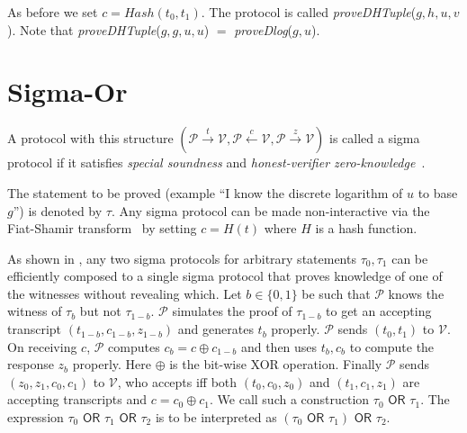 \documentclass[runningheads]{llncs}
\begin{document}
As before we set $c = Hash(t_0, t_1)$. The protocol is called \emph{proveDHTuple}($g, h, u, v$). Note that \emph{proveDHTuple}($g, g, u, u$) $=$ \emph{proveDlog}($g, u$).

\section{Sigma-Or}
\label{sigmaor}
A protocol with this structure $(\mathcal{P} \stackrel{t}{\rightarrow}\mathcal{V}, \mathcal{P} \stackrel{c}{\leftarrow}\mathcal{V}, \mathcal{P} \stackrel{z}{\rightarrow}\mathcal{V})$ is called a sigma protocol if it satisfies {\em special soundness} and {\em honest-verifier zero-knowledge}~\cite{Dam10}.

The statement to be proved (example ``I know the discrete logarithm of $u$ to base $g$'') is denoted by $\tau$.
Any sigma protocol can be made non-interactive via the Fiat-Shamir transform~\cite{fiatshamir} by setting $c= H(t)$ where $H$ is a hash function.

As shown in \cite{CDS94}, any two sigma protocols for arbitrary statements $\tau_0, \tau_1$ can be efficiently composed to a single sigma protocol that proves knowledge of one of the witnesses without revealing which. Let $b \in \{0, 1\}$ be such that $\mathcal{P}$ knows the witness of $\tau_{b}$ but not $\tau_{1-b}$.
$\mathcal{P}$ simulates the proof of $\tau_{1-b}$ to get an accepting transcript $(t_{1-b}, c_{1-b}, z_{1-b})$ and generates $t_b$ properly. $\mathcal{P}$ sends $(t_0, t_1)$ to $\mathcal{V}$. On receiving $c$, $\mathcal{P}$ computes $c_b = c \oplus c_{1-b}$ and then uses $t_b, c_b$ to compute the response $z_b$ properly. Here $\oplus$ is the bit-wise XOR operation. Finally $\mathcal{P}$ sends $(z_0, z_1, c_0, c_1)$ to $\mathcal{V}$, who accepts iff both $(t_0, c_0, z_0)$ and $(t_1, c_1, z_1)$ are accepting transcripts and $c = c_0 \oplus c_1$.
We call such a construction $\tau_0 \textsf{ OR } \tau_1$. The expression $\tau_0\textsf{ OR }\tau_1\textsf{ OR }\tau_2$ is to be interpreted as $(\tau_0\textsf{ OR }\tau_1)\textsf{ OR }\tau_2$.
\end{document}
